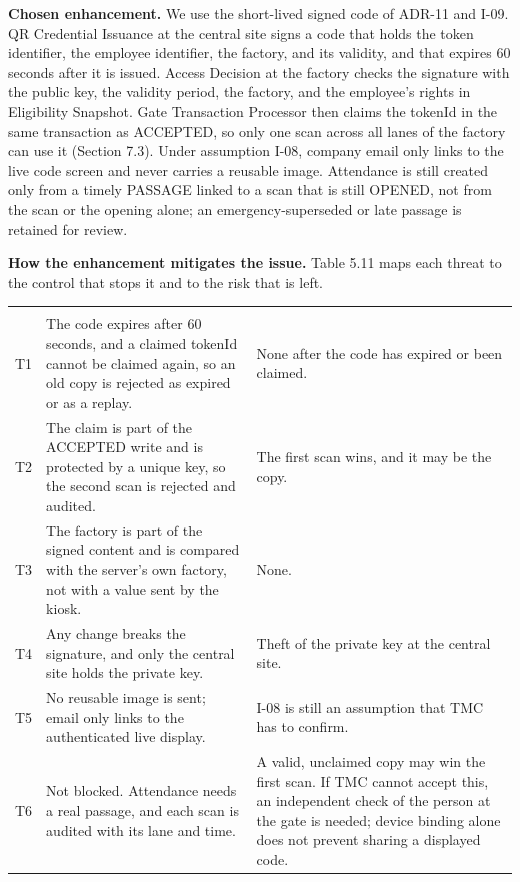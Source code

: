 \textbf{Chosen enhancement.} We use the short-lived signed code of ADR-11 and I-09. QR Credential Issuance at the central site signs a code that holds the token identifier, the employee identifier, the factory, and its validity, and that expires 60 seconds after it is issued. Access Decision at the factory checks the signature with the public key, the validity period, the factory, and the employee's rights in Eligibility Snapshot. Gate Transaction Processor then claims the tokenId in the same transaction as ACCEPTED, so only one scan across all lanes of the factory can use it (Section 7.3). Under assumption I-08, company email only links to the live code screen and never carries a reusable image. Attendance is still created only from a timely PASSAGE linked to a scan that is still OPENED, not from the scan or the opening alone; an emergency-superseded or late passage is retained for review.

\textbf{How the enhancement mitigates the issue.} Table 5.11 maps each threat to the control that stops it and to the risk that is left.

\begin{longtable}{|>{\raggedright\arraybackslash}p{28pt}|>{\raggedright\arraybackslash}p{220pt}|>{\raggedright\arraybackslash}p{163pt}|}
\hline
\multicolumn{1}{|>{\columncolor{tableheader}\centering\arraybackslash}p{28pt}|}{\textbf{ID}} & \multicolumn{1}{>{\columncolor{tableheader}\centering\arraybackslash}p{220pt}|}{\textbf{Control}} & \multicolumn{1}{>{\columncolor{tableheader}\centering\arraybackslash}p{163pt}|}{\textbf{Remaining risk}} \\
\hline
\endhead
\multicolumn{3}{c}{\rule{0pt}{20pt}\normalsize\phantomsection\addcontentsline{lot}{table}{\protect\numberline{5.11}Mitigation of QR Exposure}\textbf{Table 5.11. Mitigation of QR Exposure}} \\
\endlastfoot
T1 & The code expires after 60 seconds, and a claimed tokenId cannot be claimed again, so an old copy is rejected as expired or as a replay. & None after the code has expired or been claimed. \\
\hline
T2 & The claim is part of the ACCEPTED write and is protected by a unique key, so the second scan is rejected and audited. & The first scan wins, and it may be the copy. \\
\hline
T3 & The factory is part of the signed content and is compared with the server's own factory, not with a value sent by the kiosk. & None. \\
\hline
T4 & Any change breaks the signature, and only the central site holds the private key. & Theft of the private key at the central site. \\
\hline
T5 & No reusable image is sent; email only links to the authenticated live display. & I-08 is still an assumption that TMC has to confirm. \\*
\hline\noalign{\nobreak}
T6 & Not blocked. Attendance needs a real passage, and each scan is audited with its lane and time. & A valid, unclaimed copy may win the first scan. If TMC cannot accept this, an independent check of the person at the gate is needed; device binding alone does not prevent sharing a displayed code. \\
\hline
\end{longtable}


